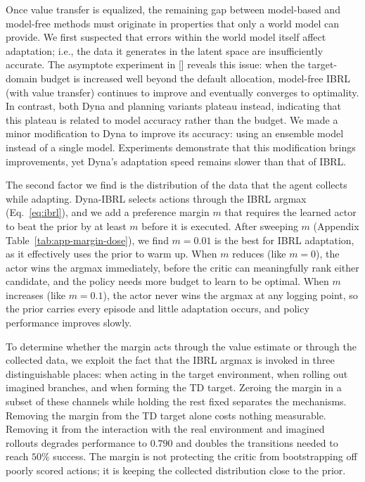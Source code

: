 \documentclass{article} %
\begin{document}
Once value transfer is equalized, the remaining gap between model-based and model-free methods must originate in properties that only a world model can provide. We first suspected that errors within the world model itself affect adaptation; i.e., the data it generates in the latent space are insufficiently accurate. The asymptote experiment in [] reveals this issue: when the target-domain budget is increased well beyond the default allocation, model-free IBRL (with value transfer) continues to improve and eventually converges to optimality. In contrast, both Dyna and planning variants plateau instead, indicating that this plateau is related to model accuracy rather than the budget. We made a minor modification to Dyna to improve its accuracy: using an ensemble model instead of a single model. Experiments demonstrate that this modification brings improvements, yet Dyna's adaptation speed remains slower than that of IBRL.




The second factor we find is the distribution of the data that the agent collects while adapting. Dyna-IBRL selects actions through the IBRL argmax (Eq.~\ref{eq:ibrl}), and we add a preference margin $m$ that requires the learned actor to beat the prior by at least $m$ before it is executed. After sweeping $m$ (Appendix Table~\ref{tab:app-margin-dose}), we find $m=0.01$ is the best for IBRL adaptation, as it effectively uses the prior to warm up. When $m$ reduces (like $m=0$), the actor wins the argmax immediately,
before the critic can meaningfully rank either candidate, and the policy needs more budget to learn to be optimal. When $m$ increases (like $m=0.1$), the actor never wins the argmax at
any logging point, so the prior carries every episode and little adaptation occurs, and policy performance improves slowly. 

To determine whether the margin acts through the value estimate or through the collected data, we exploit the fact that the IBRL argmax is invoked in three distinguishable places: when acting in the target environment, when rolling out imagined branches, and when forming the TD target. Zeroing the margin in a subset of these channels while holding the rest fixed separates the mechanisms. Removing the margin from the TD target alone costs nothing measurable. Removing it from the interaction with the real environment and imagined rollouts degrades performance to
$0.790$ and doubles the transitions needed to reach $50\%$ success. The margin is not protecting the critic from bootstrapping off poorly scored actions; it is keeping the collected distribution close to the prior.
\end{document}
